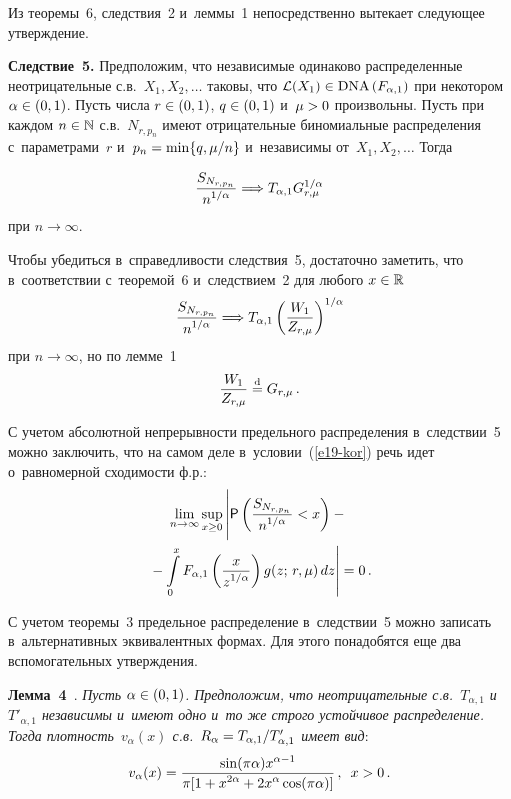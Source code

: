 \begin{multicols}{2}
\vspace*{2pt}

Из теоремы~6, следствия~2 и~леммы~1 непосредственно вытекает
следующее утверждение.

\vspace*{2pt}

\noindent
\textbf{Следствие~5.} {Предположим, что независимые одинаково
распределенные неотрицательные с.в.\ $X_1,X_2,\ldots$ таковы, что
$\mathcal{L}(X_1)\hm\in \mathrm{DNA}\,(F_{\alpha,1})$ при некотором
$\alpha\hm\in(0,1)$. Пусть числа $r\hm\in(0,1)$, $q\hm\in(0,1)$ и~$\mu\hm>0$
произвольны. Пусть при каждом $n\hm\in\mathbb{N}$ с.в.~$N_{r,p_n}$
имеют отрицательные биномиальные распределения с~параметрами~$r$ 
и~$p_n\hm=\min\{q,\mu/n\}$ и~независимы от~$X_1,X_2,\ldots$ Тогда}

\noindent
\begin{equation}
\displaystyle\frac{\displaystyle S_{N_{r,p_n}}\mathstrut}{\displaystyle n^{1/\alpha}\mathstrut}\Longrightarrow T_{\alpha,1}
G_{r,\mu}^{1/\alpha}
\label{e19-kor}
\end{equation}
при $n\to\infty$.

\pagebreak


Чтобы убедиться в~справедливости следствия~5, достаточно заметить,
что в~соответствии с~теоремой~6 и~следствием~2 для любого
$x\hm\in\mathbb{R}$
$$
\displaystyle\frac{\displaystyle S_{N_{r,p_n}}\mathstrut}{\displaystyle n^{1/\alpha}\mathstrut}\Longrightarrow T_{\alpha,1}
\left(\displaystyle\frac{\displaystyle W_1\mathstrut}{\displaystyle Z_{r,\mu}\mathstrut}\right)^{1/\alpha}
$$
при $n\to\infty$, но по лемме~1
$$
\displaystyle\frac{\displaystyle W_1\mathstrut}{\displaystyle Z_{r,\mu}\mathstrut}\stackrel{\mathrm{d}}{=} G_{r,\mu}\,.
$$

С учетом абсолютной непрерывности предельного распределения в~следствии~5 
можно заключить, что на самом деле в~условии~(\ref{e19-kor}) речь
идет о~равномерной сходимости ф.р.:
\begin{multline*}
\lim\limits_{n\to\infty}\sup\limits_{x\ge0}\left\vert 
\vphantom{\int\limits_{0}^{x}}
{\sf P}
\left(\fr{S_{N_{r,p_n}}}{n^{1/\alpha}}<x\right)-{}\right.\\
\left.{}-
\int\limits_{0}^{x}F_{\alpha,1}\left(\fr{x}{z^{1/\alpha}}\right)g(z;\,r,\mu)\,dz
\right\vert=0\,.
\end{multline*}

\smallskip

С учетом теоремы~3 предельное распределение в~следствии~5 можно
записать в~альтернативных эквивалентных формах. Для этого
понадобятся еще два вспомогательных утверждения.

\smallskip

\noindent
\textbf{Лемма~4}~\cite{KorolevZeifman2016b, KotzOstrovskii1996,
KorolevZeifman2016a}. \textit{Пусть $\alpha\hm\in(0,1)$. Предположим, что
неотрицательные с.в.~$T_{\alpha,1}$ и~$T'_{\alpha,1}$ независимы 
и~имеют одно и~то же строго устойчивое распределение. Тогда плот\-ность~$v_{\alpha}(x)$ 
с.в.~$R_{\alpha}\hm=T_{\alpha,1}/T'_{\alpha,1}$ имеет
вид}:
\begin{equation*}
v_{\alpha}(x)=\displaystyle\frac{\displaystyle \sin(\pi\alpha)x^{\alpha-1}\mathstrut}{\displaystyle \pi[1+x^{2\alpha}+2x^{\alpha}\cos(\pi\alpha)]\mathstrut}\,,\enskip
x>0\,.
\end{equation*}


\end{multicols}
